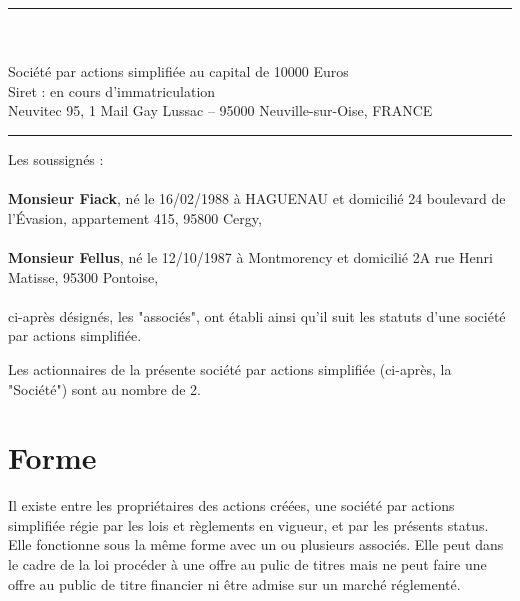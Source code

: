 \documentclass[a4paper,12pt]{report}
\newcommand{\address}{Neuvitec 95, 1 Mail Gay Lussac -- 95000 Neuville-sur-Oise, FRANCE}
\newcommand{\lfAddress}{24 boulevard de l'Évasion, appartement 415, 95800 Cergy}
\newcommand{\jfAddress}{2A rue Henri Matisse, 95300 Pontoise}
\begin{document}


\begin{center}
	\begin{minipage}{0.8\linewidth}
		\center
		\rule{\linewidth}{0.5mm}\\
		\large{}\\
		\normalsize
		Société par actions simplifiée au capital de 10000 Euros\\
		Siret : en cours d'immatriculation\\
		\normalsize{\address}\\
		\rule{\linewidth}{0.5mm}
	\end{minipage}
\end{center}
\vspace{5mm}
\noindent Les soussignés :\\\\
\textbf{Monsieur Fiack}, né le 16/02/1988 à HAGUENAU et domicilié \lfAddress,\\\\
\textbf{Monsieur Fellus}, né le 12/10/1987 à Montmorency et domicilié \jfAddress,\\\\
ci-après désignés, les "associés", ont établi ainsi qu'il suit les statuts d'une société par actions simplifiée.

Les actionnaires de la présente société par actions simplifiée (ci-après, la "Société") sont au nombre de 2.

%
%

\section{Forme}
Il existe entre les propriétaires des actions créées, une société par actions simplifiée régie par les lois et règlements en vigueur, et par les présents status.
Elle fonctionne sous la même forme avec un ou plusieurs associés.
Elle peut dans le cadre de la loi procéder à une offre au pulic de titres mais ne peut faire une offre au public de titre financier ni être admise sur un marché réglementé.
\end{document}
